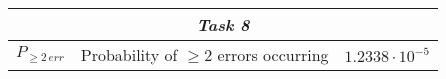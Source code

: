 \begin{center}
\begin{longtable}{|c|c|c|}
    \hline\multicolumn{3}{|c|}{\textit{Task 8}} \\\hline
    $P_{\geq2\,err}$ & Probability of $\geq2$ errors occurring & $ 1.2338\cdot10^{-5} $ \\

    \end{longtable}
\renewcommand{\arraystretch}{1}
\end{center}







\setcounter{secnumdepth}{1}